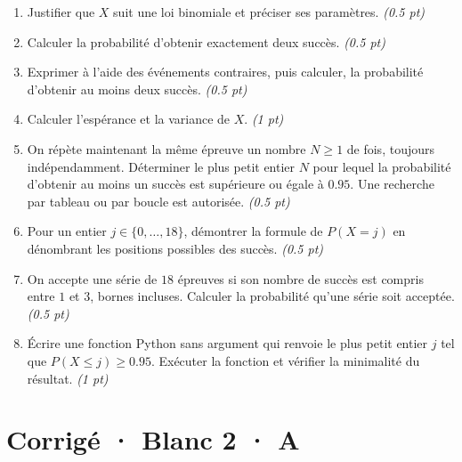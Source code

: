 \begin{enumerate}

\item Justifier que $X$ suit une loi binomiale et préciser ses paramètres. \hfill\textit{(\num{0,5} pt)}

\item Calculer la probabilité d'obtenir exactement deux succès. \hfill\textit{(\num{0,5} pt)}

\item Exprimer à l'aide des événements contraires, puis calculer, la probabilité d'obtenir au moins deux succès. \hfill\textit{(\num{0,5} pt)}

\item Calculer l'espérance et la variance de $X$. \hfill\textit{(1 pt)}

\item On répète maintenant la même épreuve un nombre $N\ge1$ de fois, toujours indépendamment. Déterminer le plus petit entier $N$ pour lequel la probabilité d'obtenir au moins un succès est supérieure ou égale à $\num{0,95}$. Une recherche par tableau ou par boucle est autorisée. \hfill\textit{(\num{0,5} pt)}

\item Pour un entier $j\in\{0,\ldots,18\}$, démontrer la formule de $P(X=j)$ en dénombrant les positions possibles des succès. \hfill\textit{(\num{0,5} pt)}

\item On accepte une série de $18$ épreuves si son nombre de succès est compris entre $1$ et $3$, bornes incluses. Calculer la probabilité qu'une série soit acceptée. \hfill\textit{(\num{0,5} pt)}

\item Écrire une fonction Python sans argument qui renvoie le plus petit entier $j$ tel que $P(X\le j)\ge\num{0,95}$. Exécuter la fonction et vérifier la minimalité du résultat. \hfill\textit{(1 pt)}

\end{enumerate}

\ifmxteacher\mxnewpage

\section*{Corrigé · Blanc 2 · A}\label{cor:8-3}

